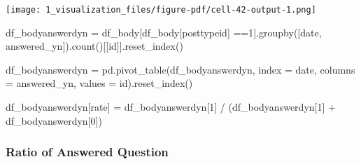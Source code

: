 \documentclass[
  letterpaper,
  DIV=11,
  numbers=noendperiod]{scrartcl}
\newenvironment{Shaded}{\begin{snugshade}}{\end{snugshade}}
\newcommand{\DecValTok}[1]{\textcolor[rgb]{0.68,0.00,0.00}{#1}}
\newcommand{\NormalTok}[1]{\textcolor[rgb]{0.00,0.23,0.31}{#1}}
\newcommand{\OperatorTok}[1]{\textcolor[rgb]{0.37,0.37,0.37}{#1}}
\newcommand{\StringTok}[1]{\textcolor[rgb]{0.13,0.47,0.30}{#1}}
\begin{document}
\texttt{[image: 1\_visualization\_files/figure-pdf/cell-42-output-1.png]}

\begin{Shaded}
\begin{Highlighting}[]
\NormalTok{df\_bodyanswerdyn }\OperatorTok{=}\NormalTok{ df\_body[df\_body[}\StringTok{\textquotesingle{}posttypeid\textquotesingle{}}\NormalTok{] }\OperatorTok{==}\StringTok{\textquotesingle{}1\textquotesingle{}}\NormalTok{].groupby([}\StringTok{\textquotesingle{}date\textquotesingle{}}\NormalTok{, }\StringTok{\textquotesingle{}answered\_yn\textquotesingle{}}\NormalTok{]).count()[[}\StringTok{\textquotesingle{}id\textquotesingle{}}\NormalTok{]].reset\_index()}
\end{Highlighting}
\end{Shaded}

\begin{Shaded}
\begin{Highlighting}[]
\NormalTok{df\_bodyanswerdyn }\OperatorTok{=}\NormalTok{ pd.pivot\_table(df\_bodyanswerdyn, index }\OperatorTok{=} \StringTok{\textquotesingle{}date\textquotesingle{}}\NormalTok{, columns }\OperatorTok{=} \StringTok{\textquotesingle{}answered\_yn\textquotesingle{}}\NormalTok{, values }\OperatorTok{=} \StringTok{\textquotesingle{}id\textquotesingle{}}\NormalTok{).reset\_index()}
\end{Highlighting}
\end{Shaded}

\begin{Shaded}
\begin{Highlighting}[]
\NormalTok{df\_bodyanswerdyn[}\StringTok{\textquotesingle{}rate\textquotesingle{}}\NormalTok{] }\OperatorTok{=}\NormalTok{ df\_bodyanswerdyn[}\DecValTok{1}\NormalTok{] }\OperatorTok{/}\NormalTok{ (df\_bodyanswerdyn[}\DecValTok{1}\NormalTok{] }\OperatorTok{+}\NormalTok{ df\_bodyanswerdyn[}\DecValTok{0}\NormalTok{])}
\end{Highlighting}
\end{Shaded}

\subsubsection{Ratio of Answered
Question}\label{ratio-of-answered-question}
\end{document}
